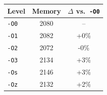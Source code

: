 \begin{tabular*}{\columnwidth}{@{\extracolsep\fill}lcc@{\extracolsep\fill}}
\toprule
\textbf{Level} & \textbf{Memory} & \textbf{$\Delta$ vs.\ \texttt{-O0}} \\
\midrule
\texttt{-O0} & 2080 & -- \\
\texttt{-O1} & 2082 & +0\% \\
\texttt{-O2} & 2072 & -0\% \\
\texttt{-O3} & 2134 & +3\% \\
\texttt{-Os} & 2146 & +3\% \\
\texttt{-Oz} & 2132 & +2\% \\
\bottomrule
\end{tabular*}
